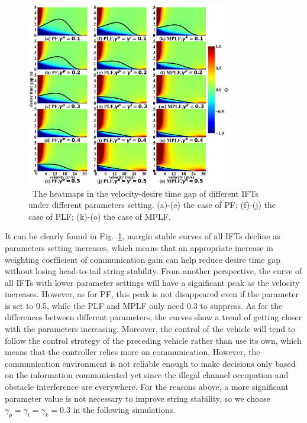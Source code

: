 \documentclass[journal]{IEEEtran}
\begin{document}
\begin{figure}
  \includegraphics[width=9cm]{fig4.png}
  \caption{~The heatmaps in the velocity-desire time gap of different IFTs under different parameters setting. (a)-(e) the case of PF; (f)-(j) the case of PLF; (k)-(o) the case of MPLF.}
  \label{Figure4}
\end{figure}


It can be clearly found in Fig.~\ref{Figure4}, margin stable curves of all IFTs decline as parameters setting increases, which means that an appropriate increase in weighting coefficient of communication gain can help reduce desire time gap without losing head-to-tail string stability. From another perspective, the curve of all IFTs with lower parameter settings will have a significant peak as the velocity increases. However, as for PF, this peak is not disappeared even if the parameter is set to 0.5, while the PLF and MPLF only need 0.3 to suppress. As for the differences between different parameters, the curves show a trend of getting closer with the parameters increasing. Moreover, the control of the vehicle will tend to follow the control strategy of the preceding vehicle rather than use its own, which means that the controller relies more on communication. However, the communication environment is not reliable enough to make decisions only based on the information communicated yet since the illegal channel occupation and obstacle interference are everywhere. For the reasons above, a more significant parameter value is not necessary to improve string stability, so we choose $\gamma_p=\gamma_l=\gamma_k=0.3$ in the following simulations.
\end{document}
